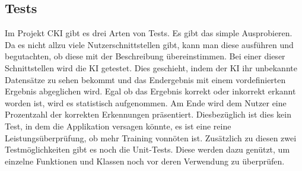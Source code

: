 \subsection{Tests}
\label{sec:DesignTests}
Im Projekt CKI gibt es drei Arten von Tests. Es gibt das simple Ausprobieren. Da es nicht allzu viele Nutzerschnittstellen gibt, kann man diese ausführen und begutachten, ob diese mit der Beschreibung übereinstimmen.
Bei einer dieser Schnittstellen wird die KI getestet. Dies geschieht, indem der KI ihr unbekannte Datensätze zu sehen bekommt und das Endergebnis mit einem vordefinierten Ergebnis abgeglichen wird.
Egal ob das Ergebnis korrekt oder inkorrekt erkannt worden ist, wird es statistisch aufgenommen. Am Ende wird dem Nutzer eine Prozentzahl der korrekten Erkennungen präsentiert. Diesbezüglich ist dies 
kein Test, in dem die Applikation versagen könnte, es ist eine reine Leistungsüberprüfung, ob mehr Training vonnöten ist.
Zusätzlich zu diesen zwei Testmöglichkeiten gibt es noch die Unit-Tests. Diese werden dazu genützt, um einzelne Funktionen und Klassen noch vor deren Verwendung zu überprüfen.



